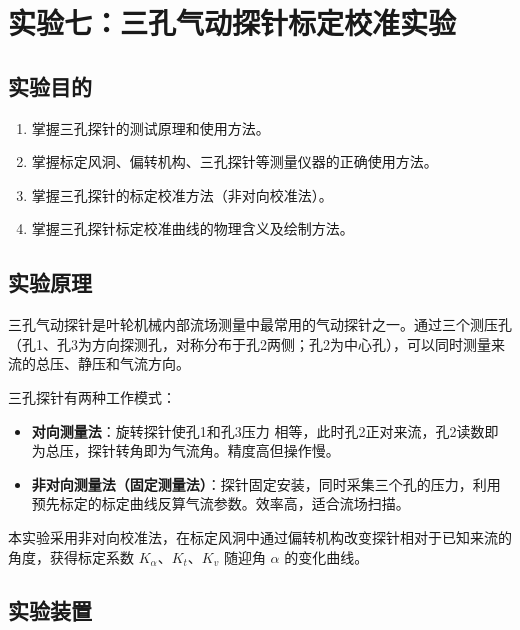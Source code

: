 
\section{实验七：三孔气动探针标定校准实验}

\subsection{实验目的}

\begin{enumerate}
    \item 掌握三孔探针的测试原理和使用方法。
    \item 掌握标定风洞、偏转机构、三孔探针等测量仪器的正确使用方法。
    \item 掌握三孔探针的标定校准方法（非对向校准法）。
    \item 掌握三孔探针标定校准曲线的物理含义及绘制方法。
\end{enumerate}

\subsection{实验原理}

三孔气动探针是叶轮机械内部流场测量中最常用的气动探针之一。通过三个测压孔（孔1、孔3为方向探测孔，对称分布于孔2两侧；孔2为中心孔），可以同时测量来流的总压、静压和气流方向。

三孔探针有两种工作模式：
\begin{itemize}
    \item \textbf{对向测量法}：旋转探针使孔1和孔3压力 相等，此时孔2正对来流，孔2读数即为总压，探针转角即为气流角。精度高但操作慢。
    \item \textbf{非对向测量法（固定测量法）}：探针固定安装，同时采集三个孔的压力，利用预先标定的标定曲线反算气流参数。效率高，适合流场扫描。
\end{itemize}

本实验采用非对向校准法，在标定风洞中通过偏转机构改变探针相对于已知来流的角度，获得标定系数 $K_\alpha$、$K_t$、$K_v$ 随迎角 $\alpha$ 的变化曲线。

\subsection{实验装置}

